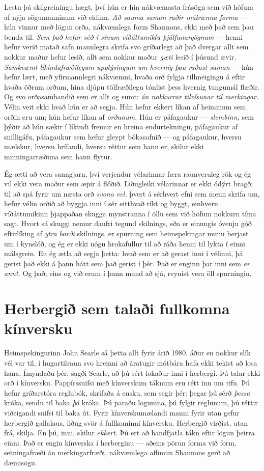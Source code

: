 Lestu þá skilgreiningu hægt, því hún er hin nákvæmasta frásögn sem við höfum af nýja sögumanninum við eldinn. \emph{Að sauma saman raðir málrænna forma} — hún vinnur með lögun orða, nákvæmlega form Shannons, ekki með það sem þau benda til. \emph{Sem það hefur séð í sínum víðáttumiklu þjálfunargögnum} — henni hefur verið matað safn mannlegra skrifa svo gríðarlegt að það dvergar allt sem nokkur maður hefur lesið, allt sem nokkur maður \emph{gæti} lesið í þúsund ævir. \emph{Samkvæmt líkindafræðilegum upplýsingum um hvernig þau raðast saman} — hún hefur lært, með yfirmannlegri nákvæmni, hvaða orð fylgja tilhneigingu á eftir hvaða öðrum orðum, hina djúpu tölfræðilegu tónlist þess hvernig tungumál flæðir. Og svo orðasambandið sem er allt og sumt: \emph{án nokkurrar tilvísunar til merkingar.} Vélin veit ekki hvað hún er að segja. Hún hefur ekkert líkan af heiminum sem orðin eru um; hún hefur líkan af \emph{orðunum.} Hún er páfagaukur — \emph{slembinn,} sem þýðir að hún sækir í líkindi fremur en hreina endurtekningu, páfagaukur af snilligáfu, páfagaukur sem hefur gleypt bókasafnið — og páfagaukur, hversu mælskur, hversu hrífandi, hversu réttur sem hann er, skilur ekki minningarræðuna sem hann flytur.

Ég ætti að vera sanngjarn, því verjendur vélarinnar færa raunveruleg rök og ég vil ekki vera maður sem æpir á flóðið. Liðugleiki vélarinnar er ekki ódýrt bragð; til að spá fyrir um næsta orð \emph{svona vel,} þvert á sérhvert efni sem menn skrifa um, hefur vélin orðið að byggja inni í sér eitthvað ríkt og byggt, einhvern víðáttumikinn þjappaðan skugga mynstranna í öllu sem við höfum nokkurn tíma sagt. Hvort sá skuggi nemur daufri tegund skilnings, eða er einungis óvenju góð eftirlíking af \emph{ytra borði} skilnings, er spurning sem heimspekingar munu berjast um í kynslóð, og ég er ekki nógu hrokafullur til að ráða henni til lykta í einni málsgrein. En ég ætla að segja þetta: hvað sem er að gerast inni í vélinni, þá gerist það ekki á þann hátt sem það gerist í þér. Það er enginn þar inni sem \emph{er annt.} Og það, eins og við erum í þann mund að sjá, reynist vera öll spurningin.

\section*{Herbergið sem talaði fullkomna kínversku}

Heimspekingurinn John Searle sá þetta allt fyrir árið 1980, áður en nokkur slík vél var til, í hugartilraun svo hreinni að áratugir mótbára hafa ekki tekist að losa hana. Ímyndaðu þér, sagði Searle, að þú sért lokaður inni í herbergi. Þú talar ekki orð í kínversku. Pappírssnifsi með kínverskum táknum eru rétt inn um rifu. Þú hefur gríðarstóra reglubók, skrifaða á ensku, sem segir þér: þegar þú sérð \emph{þessa} króka, sendu til baka \emph{þá} króka. Þú paraðu lögunina, þú fylgir reglunum, þú réttir viðeigandi snifsi til baka út. Fyrir kínverskumælandi manni fyrir utan gefur herbergið gallalaus, liðug svör á fullkominni kínversku. Herbergið virðist, utan frá, skilja. En þú, inni, skilur \emph{ekkert.} Þú ert að handfjatla tákn eftir lögun þeirra einni. Það er engin kínverska í herberginu — aðeins pörun forma við form, setningafræði án merkingarfræði, nákvæmlega aflimun Shannons gerð að dæmisögu.

